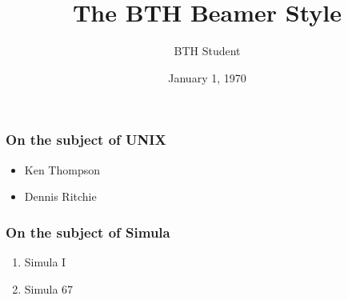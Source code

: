 \documentclass{beamer}
\title{The BTH Beamer Style}
\author{BTH Student}
\institute{Blekinge Institute of Technology}
\date{January 1, 1970} %
\begin{document}
{%
  \begin{frame}
    \titlepage
  \end{frame}
}

\begin{frame}
\frametitle{On the subject of UNIX}

\begin{itemize}
\item Ken Thompson
\item Dennis Ritchie
\end{itemize}

\end{frame}

\begin{frame}
\frametitle{On the subject of Simula}

\begin{enumerate}
\item Simula I
\item Simula 67
\end{enumerate}

\end{frame}
\end{document}
